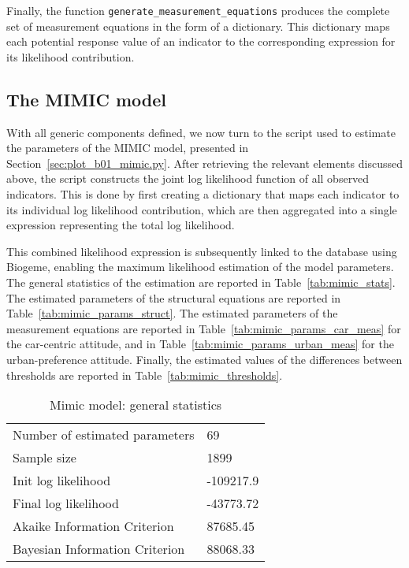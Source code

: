 \documentclass[12pt,a4paper]{article}
\begin{document}
Finally, the function \lstinline$generate_measurement_equations$
produces the complete set of measurement equations in the form of a
dictionary. This dictionary maps each potential response value of an
indicator to the corresponding expression for its likelihood
contribution.


\subsection{The MIMIC model}

With all generic components defined, we now turn to the script used to
estimate the parameters of the MIMIC model, presented in
Section~\ref{sec:plot_b01_mimic.py}. After retrieving the relevant
elements discussed above, the script constructs the joint log
likelihood function of all observed indicators. This is done by first
creating a dictionary that maps each indicator to its individual log
likelihood contribution, which are then aggregated into a single
expression representing the total log likelihood.

This combined likelihood expression is subsequently linked to the
database using Biogeme, enabling the maximum likelihood estimation of
the model parameters.
The general statistics of the
estimation are reported in Table~\vref{tab:mimic_stats}. The estimated
parameters of the structural equations are reported in
Table~\vref{tab:mimic_params_struct}. The estimated parameters of the
measurement equations are reported in
Table~\vref{tab:mimic_params_car_meas} for the car-centric attitude,
and in Table~\vref{tab:mimic_params_urban_meas} for the
urban-preference attitude. Finally, the estimated values of the
differences between thresholds are reported in
Table~\vref{tab:mimic_thresholds}.
\begin{table}[htb]
  \begin{center}
    \footnotesize
\begin{tabular}{ll}
Number of estimated parameters & 69 \\
Sample size & 1899 \\
Init log likelihood & -109217.9 \\
Final log likelihood & -43773.72 \\
Akaike Information Criterion & 87685.45 \\
Bayesian Information Criterion & 88068.33 \\
\end{tabular}
  \caption{ \label{tab:mimic_stats}Mimic model: general statistics}
  \end{center}

\end{table}
\end{document}
